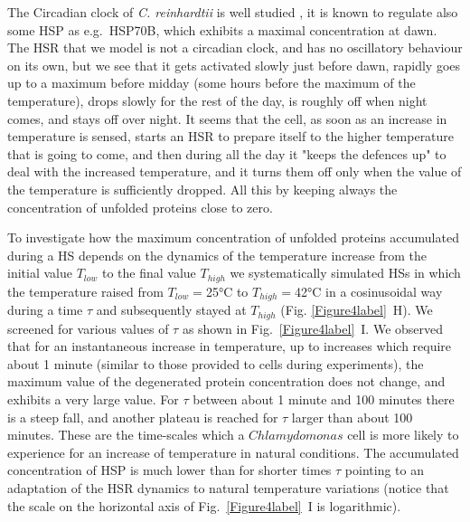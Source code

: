\documentclass[oneside, 10pt, a4paper, twocolumn]{article}
\begin{document}
The Circadian clock of \emph{C. reinhardtii} is well studied \cite{Mittag2005,Jacobshagen2001}, 
it is known to regulate also some HSP as e.g.~HSP70B, which exhibits a maximal concentration at dawn. 
The HSR that we model is not a circadian clock, and has no oscillatory behaviour on its own, but we see that it gets activated slowly just before dawn, rapidly goes up to a maximum before midday (some hours before the maximum of the temperature), drops slowly for the rest of the day, is roughly off when night comes, and stays off over night. It seems that the cell, as soon as an increase in temperature is sensed, starts an HSR to prepare itself to the higher temperature that is going to come, and then during all the day it "keeps the defences up" to deal with the increased temperature, and it turns them off only when the value of the temperature is sufficiently dropped. All this by keeping always the concentration of unfolded proteins close to zero.


To investigate how the maximum concentration of unfolded proteins accumulated during a HS depends on the dynamics of the  temperature increase from the initial value $T_{low}$ to the final value $T_{high}$ we systematically simulated HSs in which the temperature raised from $T_{low}=$25°C to $T_{high}=$42°C in a cosinusoidal way during a time  $\tau$ and subsequently stayed at $T_{high}$ (Fig. \ref{Figure4label}~H). 
We screened for various values of   $\tau$ as shown  in Fig.~\ref{Figure4label}~I. We observed that for an instantaneous increase in temperature, up to increases which require about 1 minute (similar to those provided to cells during experiments), the maximum value of the degenerated protein concentration  does not change, and exhibits a very large value. For $\tau$ between about 1 minute and 100 minutes there is a steep fall, and another plateau is reached for $\tau$ larger than about 100 minutes. These are the time-scales which a $Chlamydomonas$ cell is more likely to experience for an increase of temperature in natural conditions. The accumulated concentration of HSP is much lower than for shorter times $\tau$ pointing to an adaptation of the  HSR dynamics to natural temperature variations %
(notice that the scale on the horizontal axis of Fig.~\ref{Figure4label}~I is logarithmic).
\end{document}

